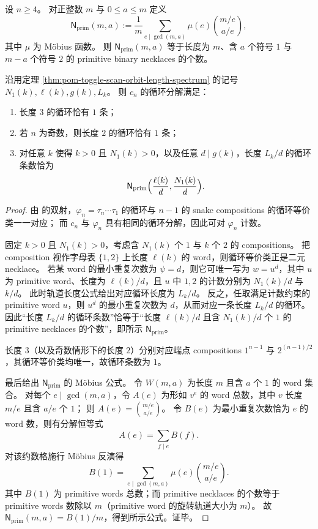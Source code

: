 \begin{theorem}\label{thm:pom-toggle-scan-cycle-type-closed}
设 \(n\ge 4\)。
对正整数 \(m\) 与 \(0\le a\le m\) 定义
\[
\mathsf N_{\mathrm{prim}}(m,a)
:=\frac1m\sum_{e\mid\gcd(m,a)}\mu(e)\binom{m/e}{a/e},
\]
其中 \(\mu\) 为 Möbius 函数。
则 \(\mathsf N_{\mathrm{prim}}(m,a)\) 等于长度为 \(m\)、含 \(a\) 个符号 \(1\) 与 \(m-a\) 个符号 \(2\) 的 primitive binary necklaces 的个数。

沿用定理 \ref{thm:pom-toggle-scan-orbit-length-spectrum} 的记号 \(N_1(k),\ell(k),g(k),L_k\)。
则 \(c_n\) 的循环分解满足：
\begin{enumerate}
  \item 长度 \(3\) 的循环恰有 \(1\) 条；
  \item 若 \(n\) 为奇数，则长度 \(2\) 的循环恰有 \(1\) 条；
  \item 对任意 \(k\) 使得 \(k>0\) 且 \(N_1(k)>0\)，以及任意 \(d\mid g(k)\)，长度 \(L_k/d\) 的循环条数恰为
  \[
  \mathsf N_{\mathrm{prim}}\Bigl(\frac{\ell(k)}{d},\frac{N_1(k)}{d}\Bigr).
  \]
\end{enumerate}
\end{theorem}
\begin{proof}
由 \cite{JosephRoby2018TogglingIndependentSetsPath} 的双射，\(\varphi_n=\tau_n\cdots\tau_1\) 的循环与 \(n-1\) 的 snake compositions 的循环等价类一一对应；
而 \(c_n\) 与 \(\varphi_n\) 具有相同的循环分解，因此可对 \(\varphi_n\) 计数。
\par
固定 \(k>0\) 且 \(N_1(k)>0\)，考虑含 \(N_1(k)\) 个 \(1\) 与 \(k\) 个 \(2\) 的 compositions。
把 composition 视作字母表 \(\{1,2\}\) 上长度 \(\ell(k)\) 的 word，则循环等价类正是二元 necklace。
若某 word 的最小重复次数为 \(\psi=d\)，则它可唯一写为 \(w=u^d\)，其中 \(u\) 为 primitive word、长度为 \(\ell(k)/d\)，且 \(u\) 中 \(1,2\) 的计数分别为 \(N_1(k)/d\) 与 \(k/d\)。
此时轨道长度公式给出对应循环长度为 \(L_k/d\)。
反之，任取满足计数约束的 primitive word \(u\)，则 \(u^d\) 的最小重复次数为 \(d\)，从而对应一条长度 \(L_k/d\) 的循环。
因此“长度 \(L_k/d\) 的循环条数”恰等于“长度 \(\ell(k)/d\) 且含 \(N_1(k)/d\) 个 \(1\) 的 primitive necklaces 的个数”，即所示 \(\mathsf N_{\mathrm{prim}}\)。
\par
长度 \(3\)（以及奇数情形下的长度 \(2\)）分别对应端点 compositions \(1^{n-1}\) 与 \(2^{(n-1)/2}\)，其循环等价类均唯一，故循环条数为 \(1\)。
\par
最后给出 \(\mathsf N_{\mathrm{prim}}\) 的 Möbius 公式。
令 \(W(m,a)\) 为长度 \(m\) 且含 \(a\) 个 \(1\) 的 word 集合。
对每个 \(e\mid\gcd(m,a)\)，令 \(A(e)\) 为形如 \(v^e\) 的 word 总数，其中 \(v\) 长度 \(m/e\) 且含 \(a/e\) 个 \(1\)；
则 \(A(e)=\binom{m/e}{a/e}\)。
令 \(B(e)\) 为最小重复次数恰为 \(e\) 的 word 数，则有分解恒等式
\[
A(e)=\sum_{f\mid e} B(f).
\]
对该约数格施行 Möbius 反演得
\[
B(1)=\sum_{e\mid\gcd(m,a)}\mu(e)\binom{m/e}{a/e}.
\]
其中 \(B(1)\) 为 primitive words 总数；而 primitive necklaces 的个数等于 primitive words 数除以 \(m\)（primitive word 的旋转轨道大小为 \(m\)）。
故
\(
\mathsf N_{\mathrm{prim}}(m,a)=B(1)/m
\)，得到所示公式。证毕。
\end{proof}


